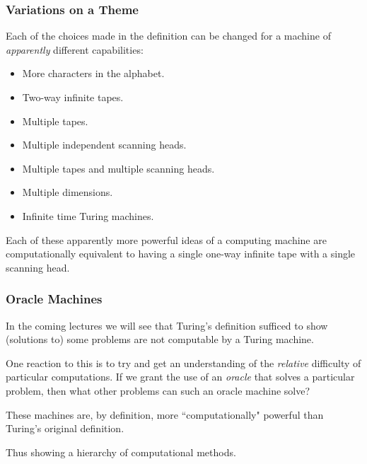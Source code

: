 \documentclass{beamer}
\begin{document}
\begin{frame}
	\frametitle{Variations on a Theme}

	Each of the choices made in the definition can be changed for a machine of \emph{apparently} different capabilities: 

		\begin{itemize}
			\item[] More characters in the alphabet.
			\item[] Two-way infinite tapes.
			\item[] Multiple tapes.
			\item[] Multiple independent scanning heads.
			\item[] Multiple tapes and multiple scanning heads.
			\item[] Multiple dimensions.
			\item[] Infinite time Turing machines.
		\end{itemize}
	
	Each of these apparently more powerful ideas of a computing machine are computationally equivalent to having a single one-way infinite tape with a single scanning head.

\end{frame}

\begin{frame}
	\frametitle{Oracle Machines}
	
	In the coming lectures we will see that Turing's definition sufficed to show (solutions to) some problems are not computable by a Turing machine.

	\vspace{0.5cm}

	One reaction to this is to try and get an understanding of the \emph{relative} difficulty of particular computations. If we grant the use of an \emph{oracle} that solves a particular problem, then what other problems can such an oracle machine solve? 

	\vspace{0.5cm}

	These machines are, by definition, more ``computationally" powerful than Turing's original definition. 
	
	\vspace{0.5cm}

	Thus showing a hierarchy of computational methods. 

\end{frame}
\end{document}
